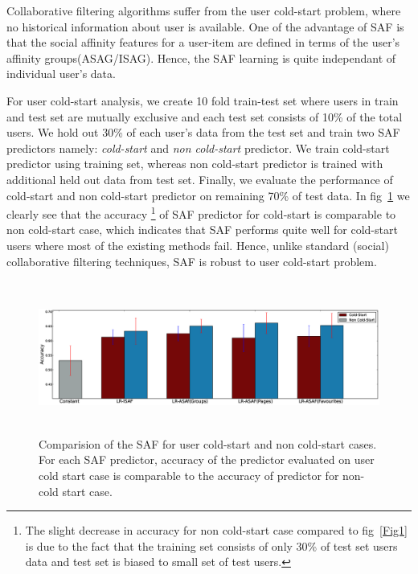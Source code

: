 Collaborative filtering algorithms suffer from the user cold-start problem,
where no historical information about user is available. One of the advantage of SAF is that 
the social affinity features for a user-item are defined in terms of the user's affinity groups(ASAG/ISAG).
Hence, the SAF learning is quite independant of individual user's data. 

For user cold-start analysis, we create 10 fold train-test set where users in train and test set are mutually exclusive
and each test set consists of 10\% of the total users. We hold out 30\% of each user's data from the test set 
and train two SAF predictors namely: \textit{cold-start} and \textit{non cold-start} predictor.
We train cold-start predictor using training set, whereas non cold-start predictor is trained with additional 
held out data from test set. Finally, we evaluate the performance of cold-start and non cold-start predictor on remaining 70\% 
of test data. In fig~\ref{fig:coldstart} we clearly see that the accuracy \footnote{ The slight decrease in accuracy for non cold-start case compared to 
fig~\ref{Fig1} is due to the fact that the training set consists of only 30\% of test set users data and test 
set is biased to small set of test users.} of  SAF predictor for cold-start is comparable
to non cold-start case, which indicates that SAF performs quite well for cold-start users where most of the
existing methods fail. Hence, unlike standard (social) collaborative filtering techniques, SAF is robust to user 
cold-start problem.  


\begin{figure}[tbp!]
\centering
\includegraphics[width=180mm,height=50mm]{data/plots/new/cold_start.eps}
\vspace{-3mm}
\caption{Comparision of the SAF for user cold-start and non cold-start cases.
For each SAF predictor, accuracy of the predictor evaluated on user
cold start case is comparable to the accuracy of predictor for non-cold start case.}
\label{fig:coldstart}
\end{figure}
 

